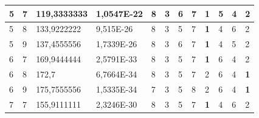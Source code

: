 \documentclass[conference]{IEEEtran}
\begin{document}
\begin{table}[]
\begin{tabular}{|llll|llllllll|}
		\multicolumn{1}{|l|}{5}   & \multicolumn{1}{l|}{7}         & \multicolumn{1}{l|}{119,3333333}   & 1,0547E-22 & \multicolumn{1}{l|}{8}   & \multicolumn{1}{l|}{3}   & \multicolumn{1}{l|}{6}   & \multicolumn{1}{l|}{7}   & \multicolumn{1}{l|}{\textbf{1}} & \multicolumn{1}{l|}{5}   & \multicolumn{1}{l|}{4}   & 2                      \\ \hline
		\multicolumn{1}{|l|}{5}   & \multicolumn{1}{l|}{8}         & \multicolumn{1}{l|}{133,9222222}   & 9,515E-26  & \multicolumn{1}{l|}{8}   & \multicolumn{1}{l|}{3}   & \multicolumn{1}{l|}{5}   & \multicolumn{1}{l|}{7}   & \multicolumn{1}{l|}{\textbf{1}} & \multicolumn{1}{l|}{4}   & \multicolumn{1}{l|}{6}   & 2                      \\ \hline
		\multicolumn{1}{|l|}{5}   & \multicolumn{1}{l|}{9}         & \multicolumn{1}{l|}{137,4555556}   & 1,7339E-26 & \multicolumn{1}{l|}{8}   & \multicolumn{1}{l|}{3}   & \multicolumn{1}{l|}{6}   & \multicolumn{1}{l|}{7}   & \multicolumn{1}{l|}{\textbf{1}} & \multicolumn{1}{l|}{4}   & \multicolumn{1}{l|}{5}   & 2                      \\ \hline
		\multicolumn{1}{|l|}{6}   & \multicolumn{1}{l|}{7}         & \multicolumn{1}{l|}{169,9444444}   & 2,5791E-33 & \multicolumn{1}{l|}{8}   & \multicolumn{1}{l|}{3}   & \multicolumn{1}{l|}{5}   & \multicolumn{1}{l|}{7}   & \multicolumn{1}{l|}{\textbf{1}} & \multicolumn{1}{l|}{6}   & \multicolumn{1}{l|}{4}   & 2                      \\ \hline
		\multicolumn{1}{|l|}{6}   & \multicolumn{1}{l|}{8}         & \multicolumn{1}{l|}{172,7}         & 6,7664E-34 & \multicolumn{1}{l|}{8}   & \multicolumn{1}{l|}{3}   & \multicolumn{1}{l|}{5}   & \multicolumn{1}{l|}{7}   & \multicolumn{1}{l|}{2}          & \multicolumn{1}{l|}{6}   & \multicolumn{1}{l|}{4}   & \textbf{1}             \\ \hline
		\multicolumn{1}{|l|}{6}   & \multicolumn{1}{l|}{9}         & \multicolumn{1}{l|}{175,7555556}   & 1,5335E-34 & \multicolumn{1}{l|}{7}   & \multicolumn{1}{l|}{3}   & \multicolumn{1}{l|}{5}   & \multicolumn{1}{l|}{8}   & \multicolumn{1}{l|}{2}          & \multicolumn{1}{l|}{6}   & \multicolumn{1}{l|}{4}   & \textbf{1}             \\ \hline
		\multicolumn{1}{|l|}{7}   & \multicolumn{1}{l|}{7}         & \multicolumn{1}{l|}{155,9111111}   & 2,3246E-30 & \multicolumn{1}{l|}{8}   & \multicolumn{1}{l|}{3}   & \multicolumn{1}{l|}{5}   & \multicolumn{1}{l|}{7}   & \multicolumn{1}{l|}{\textbf{1}} & \multicolumn{1}{l|}{4}   & \multicolumn{1}{l|}{6}   & 2                      \\ \hline

\end{tabular}
\end{table}
\end{document}
